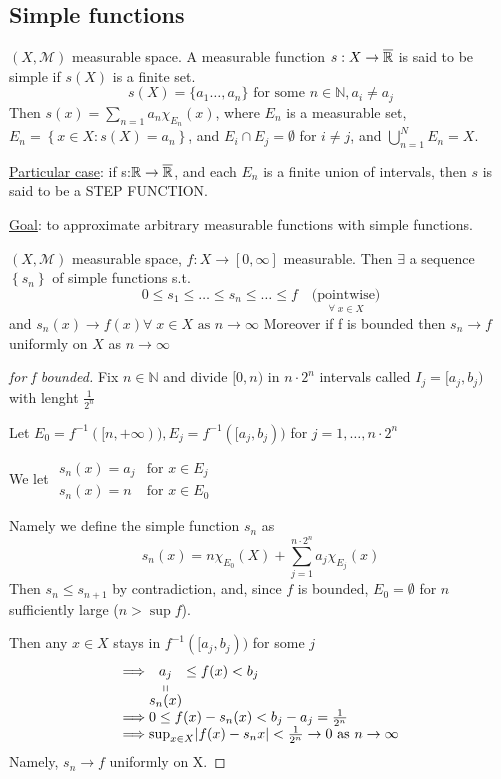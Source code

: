 \subsection*{Simple functions}
\begin{definition}
    \((X, \mathcal{M})\) measurable space. A measurable function \(s:X \to \barreal\) is said to be simple if \(s(X)\) is a finite set. 
    \[
        s(X) = \{a_1 \ldots, a_n\} \mbox{ for some }n \in \mathbb{N}, a_i \not= a_j
    \]
    Then \(s(x) = \sum_{n = 1} a_n \chi_{E_n}(x)\), where \(E_n\) is a measurable set, \(E_n = \left\{ x \in X : s(X) = a_n \right\}\), and \(E_i \cap E_j = \emptyset\) for \(i \not = j\), and \(\bigcup_{n = 1}^N E_n = X\).
\end{definition}
\underline{Particular case}: if s:\(\mathbb{R} \to \barreal\), and each \(E_n\) is a finite union of intervals, then \(s\) is said to be a STEP FUNCTION.

\underline{Goal}: to approximate arbitrary measurable functions with simple functions.
\begin{theorem}
    \((X,\mathcal{M})\) measurable space, \(f: X \to [0, \infty]\) measurable. Then \(\exists\) a sequence \(\left\lbrace s_n \right\rbrace\) of simple functions s.t. 
    \[
        0 \leq s_1 \leq \ldots \leq s_n \leq \ldots \leq f \quad \underset{\forall \; x \in X}{\mbox{(pointwise)}}
    \]
    and \(s_n(x) \to f(x) \forall \; x \in X \mbox{ as }n \to \infty\)
Moreover if f is bounded then \(s_n \to f\) uniformly on \(X\) as \(n \to \infty\)
\end{theorem}
\begin{proof}[for f bounded]
    Fix \(n \in \mathbb{N}\) and divide \([0,n)\) in \(n \cdot 2^n\) intervals called \(I_j = [a_j,b_j)\) with lenght \(\frac{1}{2^n}\)

    Let \(E_0 = f^{-1}([n, +\infty)), E_j = f^{-1}([a_j, b_j))\) for \(j = 1, \ldots, n\cdot 2^n\)
    
    We let \(\begin{array}{cc}
        s_n(x) = a_j & \mbox{for } x \in E_j \\
        s_n(x) = n & \mbox{for } x \in E_0
    \end{array}\)

    Namely we define the simple function \(s_n\) as
    \[
    s_n (x) = n\chi_{E_0}(X) + \sum_{j =1}^{n \cdot 2^n} a_j \chi_{E_j}(x)    
    \]
    Then \(s_n \leq s_{n+1}\) by contradiction, and, since \(f\) is bounded, \(E_0 = \emptyset\) for \(n\) sufficiently large (\(n > \sup f\)).

    Then any \(x \in X\) stays in \(f^{-1}([a_j, b_j))\) for some \(j\) 
    \[
        \begin{array}{l}
            \Longrightarrow \stackbelow{a_j}{s_n(x)} \leq f(x) < b_j \\
            \Longrightarrow 0 \leq f(x)-s_n(x) < b_j - a_j = \frac{1}{2^n} \\
            \Longrightarrow \sup_{x \in X} \abs{f(x)- s_n{x}} < \frac{1}{2^n} \to 0 \mbox{ as } n \to \infty
        \end{array}
    \]
    Namely, \(s_n \to f\) uniformly on X.
\end{proof}
